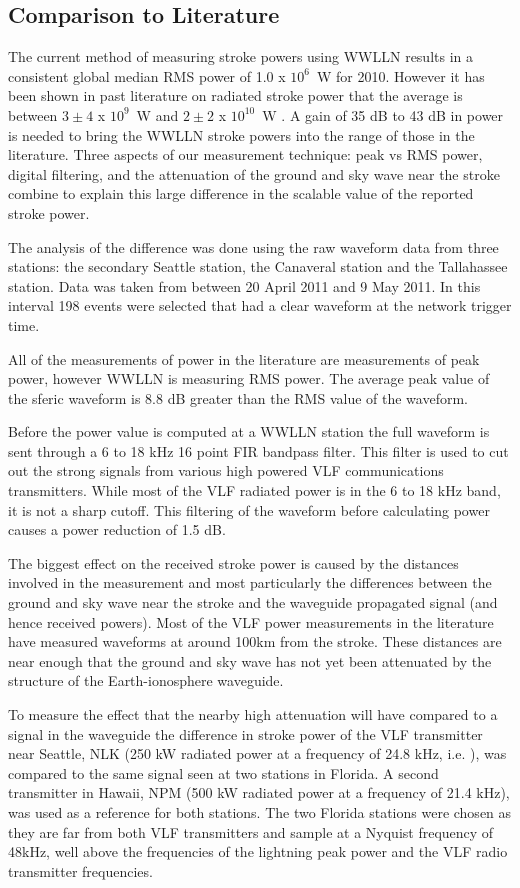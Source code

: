 \subsection{Comparison to Literature}

The current method of measuring stroke powers using WWLLN results in a consistent global median RMS power of 1.0 x $10^6$~W for 2010.
However it has been shown in past literature on radiated stroke power that the average is between $3\pm4$ x $10^9$~W and  $2\pm2$ x $10^{10}$~W \citep{Krider1983}.
A gain of 35 dB to 43 dB in power is needed to bring the WWLLN stroke powers into the range of those in the literature.
Three aspects of our measurement technique: peak vs RMS power, digital filtering, and the attenuation of the ground and sky wave near the stroke combine to explain this large difference in the scalable value of the reported stroke power.

The analysis of the difference was done using the raw waveform data from three stations: the secondary Seattle station, the Canaveral station and the Tallahassee station.
Data was taken from between 20 April 2011 and 9 May 2011. In this interval 198 events were selected that had a clear waveform at the network trigger time.

All of the measurements of power in the literature are measurements of peak power, however WWLLN is measuring RMS power.
The average peak value of the sferic waveform is 8.8 dB greater than the RMS value of the waveform. 

Before the power value is computed at a WWLLN station the full waveform is sent through a 6 to 18 kHz 16 point FIR bandpass filter.
This filter is used to cut out the strong signals from various high powered VLF communications transmitters.
While most of the VLF radiated power is in the 6 to 18 kHz band, it is not a sharp cutoff.
This filtering of the waveform before calculating power causes a power reduction of 1.5 dB.

The biggest effect on the received stroke power is caused by the distances involved in the measurement and most particularly the differences between the ground and sky wave near the stroke and the waveguide propagated signal (and hence received powers).
Most of the VLF power measurements in the literature have measured waveforms at around 100km from the stroke.
These distances are near enough that the ground and sky wave has not yet been attenuated by the structure of the Earth-ionosphere waveguide.

To measure the effect that the nearby high attenuation will have compared to a signal in the waveguide the difference in stroke power of the VLF transmitter near Seattle, NLK (250 kW radiated power at a frequency of 24.8 kHz, i.e. \citet{Clilverd2009}), was compared to the same signal seen at two stations in Florida.
A second transmitter in Hawaii, NPM (500 kW radiated power at a frequency of 21.4 kHz), was used as a reference for both stations.
The two Florida stations were chosen as they are far from both VLF transmitters and sample at a Nyquist frequency of 48kHz, well above the frequencies of the lightning peak power and the VLF radio transmitter frequencies.


